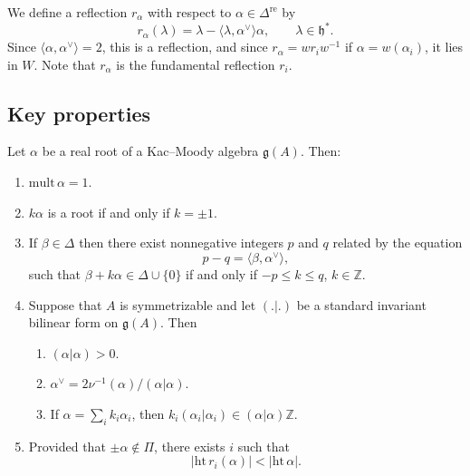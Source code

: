 \documentclass[12pt]{article}
\begin{document}
We define a reflection $r_\alpha$ with respect to $\alpha \in \Delta^{\mathrm{re}}$ by
\[
    r_\alpha(\lambda) = \lambda - \langle \lambda, \alpha^\vee\rangle \alpha,
    \qquad \lambda \in \mathfrak{h}^*.
\]
Since $\langle \alpha,\alpha^\vee\rangle = 2$, this is a reflection, and since
$r_\alpha = w r_i w^{-1}$ if $\alpha = w(\alpha_i)$, it lies in $W$. Note that $r_\alpha$ is the fundamental reflection $r_i$.
\subsection{Key properties}
\begin{proposition}\label{prop:real-roots}
    Let $\alpha$ be a real root of a Kac--Moody algebra $\mathfrak{g}(A)$. Then:
    \begin{enumerate}[label=\alph*)]
        \item $\mathrm{mult}\,\alpha = 1$.
        \item $k\alpha$ is a root if and only if $k = \pm 1$.
        \item If $\beta \in \Delta$ then there exist nonnegative integers $p$ and $q$ related by the equation
              \[
                  p - q = \langle \beta, \alpha^\vee \rangle,
              \]
              such that $\beta + k\alpha \in \Delta \cup \{0\}$ if and only if $-p \leq k \leq q$, $k \in \mathbb{Z}$.
        \item Suppose that $A$ is symmetrizable and let $(.|.)$ be a standard invariant bilinear form on $\mathfrak{g}(A)$. Then
              \begin{enumerate}[label=(\roman*)]
                  \item $(\alpha|\alpha) > 0$.
                  \item $\alpha^\vee = 2\nu^{-1}(\alpha)/(\alpha|\alpha)$.
                  \item If $\alpha = \sum_i k_i \alpha_i$, then $k_i(\alpha_i|\alpha_i) \in (\alpha|\alpha)\mathbb{Z}$.
              \end{enumerate}
        \item Provided that $\pm \alpha \notin \Pi$, there exists $i$ such that
              \[
                  |\mathrm{ht}\, r_i(\alpha)| < |\mathrm{ht}\,\alpha|.
              \]
    \end{enumerate}
\end{proposition}
\end{document}
